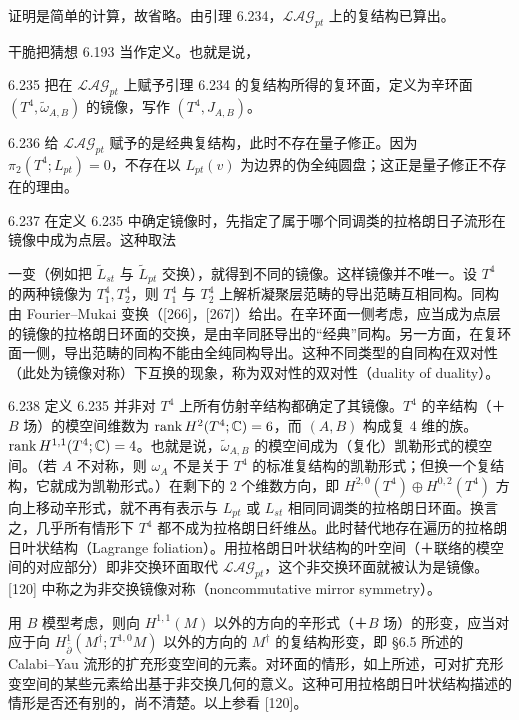 证明是简单的计算，故省略。由引理 6.234，$\mathcal{LAG}_{pt}$ 上的复结构已算出。

干脆把猜想 6.193 当作定义。也就是说，

\begin{definition}{6.235}
  把在 $\mathcal{LAG}_{pt}$ 上赋予引理 6.234 的复结构所得的复环面，定义为辛环面 $(T^4,\tilde\omega_{A,B})$ 的镜像，写作 $(T^4,J_{A,B})$。
\end{definition}

\begin{remark}{6.236}
  给 $\mathcal{LAG}_{pt}$ 赋予的是经典复结构，此时不存在量子修正。因为 $\pi_2(T^4;L_{pt})=0$，不存在以 $L_{pt}(v)$ 为边界的伪全纯圆盘；这正是量子修正不存在的理由。
\end{remark}

\begin{remark}{6.237}
  在定义 6.235 中确定镜像时，先指定了属于哪个同调类的拉格朗日子流形在镜像中成为点层。这种取法

  一变（例如把 $\tilde L_{st}$ 与 $\tilde L_{pt}$ 交换），就得到不同的镜像。这样镜像并不唯一。设 $T^4$ 的两种镜像为 $T^4_1,T^4_2$，则 $T^4_1$ 与 $T^4_2$ 上解析凝聚层范畴的导出范畴互相同构。同构由 Fourier–Mukai 变换（[266]，[267]）给出。在辛环面一侧考虑，应当成为点层的镜像的拉格朗日环面的交换，是由辛同胚导出的“经典”同构。另一方面，在复环面一侧，导出范畴的同构不能由全纯同构导出。这种不同类型的自同构在双对性（此处为镜像对称）下互换的现象，称为双对性的双对性（duality of duality）。
\end{remark}

\begin{remark}{6.238}
  定义 6.235 并非对 $T^4$ 上所有仿射辛结构都确定了其镜像。$T^4$ 的辛结构（＋$B$ 场）的模空间维数为 $\operatorname{rank} H^2(T^4;\mathbb{C})=6$，而 $(A,B)$ 构成复 4 维的族。$\operatorname{rank} H^{1,1}(T^4;\mathbb{C})=4$。也就是说，$\tilde\omega_{A,B}$ 的模空间成为（复化）凯勒形式的模空间。（若 $A$ 不对称，则 $\omega_A$ 不是关于 $T^4$ 的标准复结构的凯勒形式；但换一个复结构，它就成为凯勒形式。）在剩下的 2 个维数方向，即 $H^{2,0}(T^4)\oplus H^{0,2}(T^4)$ 方向上移动辛形式，就不再有表示与 $L_{pt}$ 或 $L_{st}$ 相同同调类的拉格朗日环面。换言之，几乎所有情形下 $T^4$ 都不成为拉格朗日纤维丛。此时替代地存在遍历的拉格朗日叶状结构（Lagrange foliation）。用拉格朗日叶状结构的叶空间（＋联络的模空间的对应部分）即非交换环面取代 $\mathcal{LAG}_{pt}$，这个非交换环面就被认为是镜像。[120] 中称之为非交换镜像对称（noncommutative mirror symmetry）。

  用 $B$ 模型考虑，则向 $H^{1,1}(M)$ 以外的方向的辛形式（＋$B$ 场）的形变，应当对应于向 $H^1_{\bar\partial}(M^\dagger;T^{1,0}M)$ 以外的方向的 $M^\dagger$ 的复结构形变，即 §6.5 所述的 Calabi–Yau 流形的扩充形变空间的元素。对环面的情形，如上所述，可对扩充形变空间的某些元素给出基于非交换几何的意义。这种可用拉格朗日叶状结构描述的情形是否还有别的，尚不清楚。以上参看 [120]。
\end{remark}

